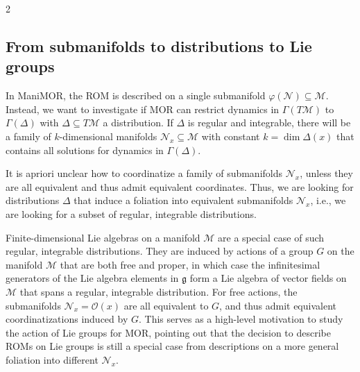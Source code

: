 \documentclass{article}
\newcommand{\yannik}[1]{\textcolor{blue}{\textbf{YW}:~#1}}
\newcommand{\M}{\mathcal{M}}                                %
\newcommand{\g}{\mathfrak{g}}                               %
\newcommand{\state}{x}
\begin{document}
\begin{multicols}{2}
\subsection{From submanifolds to distributions to Lie groups}
In ManiMOR, the ROM is described on a single submanifold $\varphi(\mathcal{N}) \subseteq \M$. Instead, we want to investigate if MOR can restrict dynamics in $\Gamma(T\M)$ to $\Gamma(\Delta)$ with $\Delta \subseteq T\M$ a distribution. If $\Delta$ is regular and integrable, there will be a family of $k$-dimensional manifolds $\mathcal{N}_\state \subseteq \M$ with constant $k = \dim \Delta(\state)$ that contains all solutions for dynamics in $\Gamma(\Delta)$.  

It is apriori unclear how to coordinatize a family of submanifolds $\mathcal{N}_\state$, unless they are all equivalent and thus admit equivalent coordinates. Thus, we are looking for distributions $\Delta$ that induce a foliation into equivalent submanifolds $\mathcal{N}_\state$, i.e., we are looking for a subset of regular, integrable distributions. 

Finite-dimensional Lie algebras on a manifold $\M$ are a special case of such regular, integrable distributions. They are induced by actions of a group $G$ on the manifold $\M$ that are both free and proper, in which case the infinitesimal generators of the Lie algebra elements in $\g$ form a Lie algebra of vector fields on $\M$ that spans a regular, integrable distribution. For free actions, the submanifolds $\mathcal{N}_\state = \mathcal{O}(\state)$ are all equivalent to $G$, and thus admit equivalent coordinatizations induced by $G$. This serves as a high-level motivation to study the action of Lie groups for MOR, pointing out that the decision to describe ROMs on Lie groups is still a special case from descriptions on a more general foliation into different $\mathcal{N}_\state$. %






\end{multicols}
\end{document}
